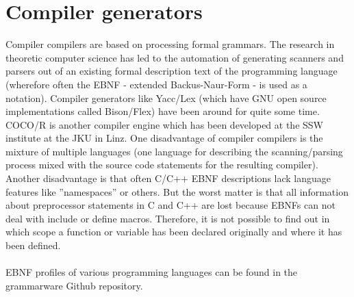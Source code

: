 \section{Compiler generators}\label{sec:compilercompilers}
Compiler compilers are based on processing formal grammars. 
The research in theoretic computer science has led to
the automation of generating scanners and parsers out of an
existing formal description text of the programming language
(wherefore often the EBNF - extended Backus-Naur-Form - is used
as a notation).
Compiler generators like Yacc/Lex (which have GNU open source
implementations called Bison/Flex) have been around for quite some time.
COCO/R\cite{COCOR} is another compiler engine which has been developed at the SSW
institute at the JKU in Linz. 
One disadvantage of compiler compilers is the mixture of multiple languages 
(one language for describing the scanning/parsing process mixed
with the source code statements for the resulting compiler).
Another disadvantage is that often C/C++ EBNF descriptions lack
language features like ''namespaces'' or others.
But the worst matter is that all information about preprocessor statements
in C and C++
are lost because EBNFs can not deal with include or define macros.
Therefore, it is not possible to find out in which scope a function or variable
has been declared originally and where it has been defined.
\\ \ \\ 
EBNF profiles of various programming languages can be found 
in the grammarware Github repository\cite{Grammarzoo}.

